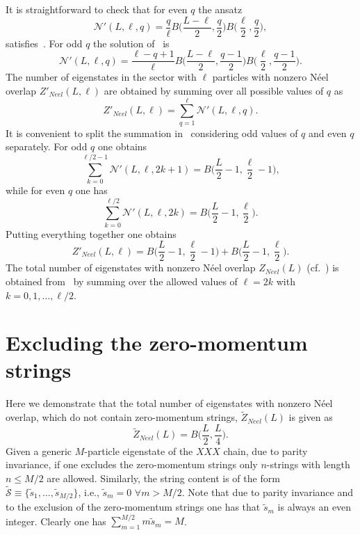 \documentclass[11pt]{iopart}
\begin{document}
It is straightforward to check that for even $q$ the ansatz 
%
\begin{equation}
{\mathcal N}'(L,\ell,q)=\frac{q}{\ell}B\Big(\frac{L-\ell}{2},\frac{q}{2}\Big)
B\Big(\frac{\ell}{2},\frac{q}{2}\Big),
\end{equation}
% 
satisfies~. For odd $q$ the solution of~ is 
%
\begin{equation}
{\mathcal N}'(L,\ell,q)=\frac{\ell-q+1}{\ell}B\Big(\frac{L-\ell}{2},\frac{q-1}{2}
\Big)B\Big(\frac{\ell}{2},\frac{q-1}{2}\Big).
\end{equation}
%
The number of eigenstates in the sector with $\ell$ particles with nonzero 
N\'eel overlap $Z'_{Neel}(L,\ell)$ are obtained by summing over all possible values 
of $q$ as 
%
\begin{equation}
\label{sum1}
Z'_{Neel}(L,\ell)=\sum\limits_{q=1}^\ell {\mathcal N}'(L,\ell,q).
\end{equation}
%
It is convenient to split the summation in~ considering odd values of $q$ 
and even $q$ separately. For odd $q$ one obtains 
%
\begin{equation}
\sum\limits_{k=0}^{\ell/2-1} {\mathcal N}'(L,\ell,2k+1)=B\Big(\frac{L}{2}-1,
\frac{\ell}{2}-1\Big),
\end{equation}
%
while for even $q$ one has 
%
\begin{equation}
\sum\limits_{k=0}^{\ell/2} {\mathcal N}'(L,\ell,2k)=B\Big(\frac{L}{2}-1,
\frac{\ell}{2}\Big). 
\end{equation}
%
Putting everything together one obtains 
%
\begin{equation}
\label{N-count-p}
Z'_{Neel}(L,\ell)=B\Big(\frac{L}{2}-1,
\frac{\ell}{2}-1\Big)+B\Big(\frac{L}{2}-1,
\frac{\ell}{2}\Big). 
\end{equation}
%
The total number of eigenstates with nonzero N\'eel overlap $Z_{Neel}(L)$ 
(cf.~) is obtained from~ by summing over 
the allowed values of $\ell=2k$ with $k=0,1,\dots,\ell/2$. 


\section{Excluding the zero-momentum strings}
\label{app-2}

Here we demonstrate that the total number of eigenstates with nonzero N\'eel overlap, 
which do not contain zero-momentum strings, $\widetilde Z_{Neel}(L)$ is given as 
%
\begin{equation}
\widetilde Z_{Neel}(L)=B\Big(\frac{L}{2},\frac{L}{4}\Big). 
\end{equation}
%
Given a generic $M$-particle eigenstate of the $XXX$ chain, due to parity invariance, 
if one excludes the zero-momentum strings only $n$-strings with length $n\le M/2$ 
are allowed. Similarly, the string content is of the form $\widetilde{\mathcal S}
\equiv\{\tilde s_1,\dots,\tilde s_{M/2}\}$, i.e., $\tilde s_m=0$ $\forall m>M/2$.
Note that due to parity invariance and to the exclusion of the zero-momentum strings 
one has that $\tilde s_m$ is always an even integer. Clearly one has $\sum_{m=1}^{M/2}
m \tilde s_m=M$. 
\end{document}
